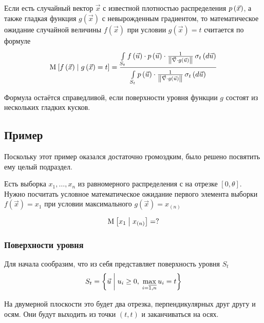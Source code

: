 \begin{theorem}
    \label{conditionalExpectationDefinition}
    Если есть случайный вектор $\vec{x}$ с известной плотностью распределения
    $\pdf{\vec{x}}$, а также гладкая функция $g\left( \vec{x} \right)$
    с невырожденным градиентом, то математическое ожидание случайной величины
    $f\left( \vec{x} \right)$ при условии $g\left( \vec{x} \right) = t$
    считается по формуле
    $$\Mean{f\left( \vec{x} \right) \mcond g\left( \vec{x} \right) = t}
        = \frac{\integrall{S_t}{\sigma_{t}\left(d\vec{u} \right)}{
            f\left( \vec{u} \right) \cdot \pdf{\vec{u}} \cdot \frac{1}{
                \left\| \vec{\nabla} \cdot g\left( \vec{u} \right) \right\|}}}
            {\integrall{S_t}{\sigma_{t}\left(d\vec{u} \right)}{
                \pdf{\vec{u}} \cdot \frac{1}{
                    \left\| \vec{\nabla}
                        \cdot g\left( \vec{u} \right) \right\|}}}$$
\end{theorem}

\begin{remark}
    Формула остаётся справедливой,
    если поверхности уровня функции $g$ состоят из нескольких гладких кусков.
\end{remark}

\subsection{Пример}
Поскольку этот пример оказался достаточно громоздким,
было решено посвятить ему целый подраздел.

Есть выборка $x_1, \dots, x_n$ из равномерного распределения
с на отрезке $\left[ 0, \theta \right]$.
Нужно посчитать условное математическое ожидание
первого элемента выборки $f\left( \vec{x} \right) = x_1$
при условии максимального $g\left( \vec{x} \right) = x_{\left( n \right)}$

$$\Mean{x_1 \mcond x_{\left( n \right)}} = ?$$

\subsubsection{Поверхности уровня}
Для начала сообразим, что из себя представляет поверхность уровня
$S_t$
$$S_t = \left\{ \vec{u} \mcond
    u_i \ge 0,\; \max_{i=\overline{1,n}} u_i = t \right\}$$

На двумерной плоскости это будет два отрезка,
перпендикулярных друг другу и осям.
Они будут выходить из точки $\left( t, t \right)$
и заканчиваться на осях.

